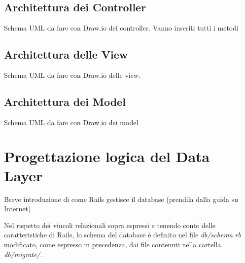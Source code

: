 \documentclass[Lau, binding=0.6cm]{sapthesis}
\begin{document}
\subsection{Architettura dei Controller}

Schema UML da fare con Draw.io dei controller. Vanno inseriti tutti i metodi

\subsection{Architettura delle View}

Schema UML da fare con Draw.io delle view. 

\subsection{Architettura dei Model}

Schema UML da fare con Draw.io dei model 

\section{Progettazione logica del Data Layer}

Breve introduzione di come Rails gestisce il database (prendila dalla guida su Internet)

Nel rispetto dei vincoli relazionali sopra espressi e tenendo conto delle caratteristiche di Rails, lo schema del database è definito nel file \textit{db/schema.rb} modificato, come espresso in precedenza, dai file contenuti nella cartella \textit{db/migrate/}.


\end{document}
